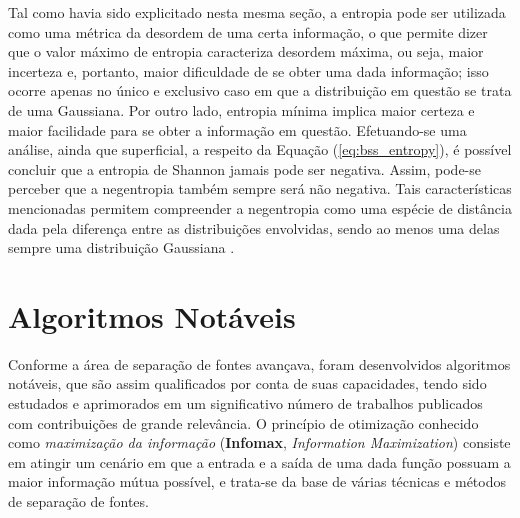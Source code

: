 Tal como havia sido explicitado nesta mesma seção, a entropia pode ser utilizada como uma métrica da desordem de uma certa informação, o que permite dizer que o valor máximo de entropia caracteriza desordem máxima, ou seja, maior incerteza e, portanto, maior dificuldade de se obter uma dada informação; isso ocorre apenas no único e exclusivo caso em que a distribuição em questão se trata de uma Gaussiana. Por outro lado, entropia mínima implica maior certeza e maior facilidade para se obter a informação em questão. Efetuando-se uma análise, ainda que superficial, a respeito da Equação (\ref{eq:bss_entropy}), é possível concluir que a entropia de Shannon jamais pode ser negativa. Assim, pode-se perceber que a negentropia também sempre será não negativa. Tais características mencionadas permitem compreender a negentropia como uma espécie de distância dada pela diferença entre as distribuições envolvidas, sendo ao menos uma delas sempre uma distribuição Gaussiana \citep{suyama2007proposta}.







\section{Algoritmos Notáveis}
\label{sec:bss_algorithms}

Conforme a área de separação de fontes avançava, foram desenvolvidos algoritmos notáveis, que são assim qualificados por conta de suas capacidades, tendo sido estudados e aprimorados em um significativo número de trabalhos publicados com contribuições de grande relevância. O princípio de otimização conhecido como \textit{maximização da informação} (\textbf{Infomax}, \textit{Information Maximization}) \citep{linsker1988self} consiste em atingir um cenário em que a entrada e a saída de uma dada função possuam a maior informação mútua possível, e trata-se da base de várias técnicas e métodos de separação de fontes.

